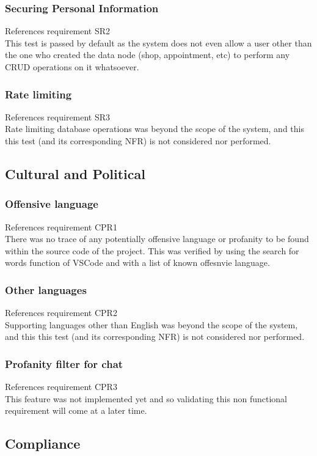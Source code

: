 \documentclass[12pt, titlepage]{article}
\begin{document}
    \subsubsection{Securing Personal Information}
        References requirement SR2\\
        This test is passed by default as the system does not even allow a user other than the one who created the data node (shop, appointment, etc) to perform any CRUD operations on it whatsoever.
    \subsubsection{Rate limiting}
        References requirement SR3\\
        Rate limiting database operations was beyond the scope of the system, and this this test (and its corresponding NFR) is not considered nor performed.

\subsection{Cultural and Political}
    \subsubsection{Offensive language}
        References requirement CPR1\\
        There was no trace of any potentially offensive language or profanity to be found within the source code of the project. This was verified by using the search for words function of VSCode and with a list of known offesnvie language.
    \subsubsection{Other languages}
        References requirement CPR2\\
        Supporting languages other than English was beyond the scope of the system, and this this test (and its corresponding NFR) is not considered nor performed.
    \subsubsection{Profanity filter for chat}
        References requirement CPR3\\
        This feature was not implemented yet and so validating this non functional requirement will come at a later time.

\subsection{Compliance}
\end{document}
